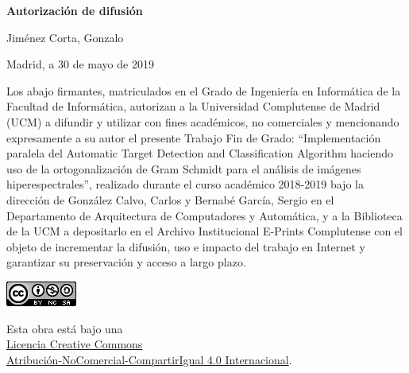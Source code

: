 % 
\newpage

\thispagestyle{empty}

\begin{center}

{\bf \Huge Autorización de difusión}

\vspace{1cm}

% 
   {\large Jiménez Corta, Gonzalo}\\

   \vspace{0.5cm}

% 
   Madrid, a 30 de mayo de 2019\\

   \vspace{0.5cm} \end{center}

Los abajo firmantes, matriculados en el Grado de Ingeniería en Informática de la
Facultad de Informática, autorizan a la Universidad Complutense de Madrid (UCM) a
difundir y utilizar con fines académicos, no comerciales y mencionando
expresamente a su autor el presente Trabajo Fin de Grado: “Implementación paralela del Automatic Target Detection and Classification Algorithm haciendo uso de la ortogonalización de Gram Schmidt para el análisis de imágenes hiperespectrales”, realizado
durante el curso académico 2018-2019 bajo la dirección de González Calvo, Carlos y Bernabé García, Sergio en el Departamento de Arquitectura de Computadores y Automática, y a la
Biblioteca de la UCM a depositarlo en el Archivo Institucional E-Prints
Complutense con el objeto de incrementar la difusión, uso e impacto del trabajo
en Internet y garantizar su preservación y acceso a largo plazo.

{
\begin{center}
\vfill
\includegraphics{figures/cc-by-nc-sa.png}
\tiny

Esta obra está bajo una\\
\href{http://creativecommons.org/licenses/by-nc-sa/4.0/}{Licencia Creative Commons\\Atribución-NoComercial-CompartirIgual 4.0 Internacional}.
\end{center}
}
